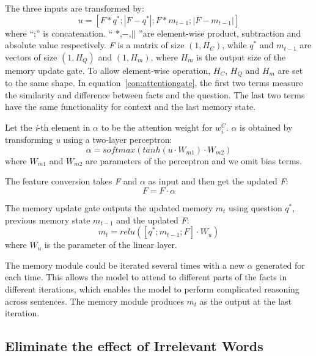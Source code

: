 \documentclass[runningheads, twocolumn]{llncs}
\begin{document}
The three inputs are transformed by:
\begin{equation}
	u = \left[F \ast q^\ast; \left|F - q^\ast\right|; F \ast m_{t-1}; \left|F - m_{t-1} \right|\right]\label{con:attentiongate}
\end{equation}
where “;” is concatenation. “ $\ast$,$-$,$\left|\right|$ ”are element-wise product, subtraction and absolute value respectively. \emph{F} is a matrix of size $\left(1, H_C\right)$, while $q^\ast$ and $m_{t-1}$ are vectors of size $\left(1, H_Q\right)$ and $\left(1, H_m\right)$, where $H_m$ is the output size of the memory update gate. To allow element-wise operation, $H_C$, $H_Q$ and $H_m$ are set to the same shape. In equation~\eqref{con:attentiongate}, the first two terms measure the similarity and difference between facts and the question. The last two terms have the same functionality for context and the last memory state.

Let the \emph{i}-th element in $\alpha$ to be the attention weight for $w_i^C$. $\alpha$ is obtained by transforming \emph{u} using a two-layer perceptron:
\begin{equation}
	\alpha = softmax\left(tanh\left(u\cdot W_{m1}\right)\cdot W_{m2}\right)
\end{equation}
where $W_{m1}$ and $W_{m2}$ are parameters of the perceptron and we omit bias terms.

The feature conversion takes \emph{F} and $\alpha$ as input and then get the updated \emph{F}:
\begin{equation}
	F = F \cdot \alpha\label{con:updatecontext}
\end{equation}

The memory update gate outputs the updated memory $m_t$ using question $q^{\ast}$, previous memory state $m_{t-1}$ and the updated \emph{F}: 
\begin{equation}
	m_t = relu\left(\left[q^\ast;m_{t-1};F\right]\cdot W_u\right)\label{con:updatememory}
\end{equation}
where $W_u$ is the parameter of the linear layer.

The memory module could be iterated several times with a new $\alpha$ generated for each time. This allows the model to attend to different parts of the facts in different iterations, which enables the model to perform complicated reasoning across sentences. The memory module produces $m_t$ as the output at the last iteration.

\subsection{Eliminate the effect  of Irrelevant Words}
\end{document}
